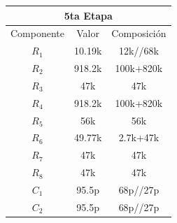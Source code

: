 \begin{table}[H]
\centering
\begin{tabular}{ccc}
\multicolumn{3}{c}{5ta Etapa}                                              \\ \hline
\multicolumn{1}{c|}{Componente} & \multicolumn{1}{c|}{Valor} & Composición \\ \hline
$R_1$                           & 10.19k                     & 12k//68k    \\
$R_2$                           & 918.2k                     & 100k+820k   \\
$R_3$                           & 47k                        & 47k         \\
$R_4$                           & 918.2k                     & 100k+820k   \\
$R_5$                           & 56k                        & 56k         \\
$R_6$                           & 49.77k                     & 2.7k+47k    \\
$R_7$                           & 47k                        & 47k         \\
$R_8$                           & 47k                        & 47k         \\
$C_1$                           & 95.5p                      & 68p//27p    \\
$C_2$                           & 95.5p                      & 68p//27p   
\end{tabular}
\end{table}
